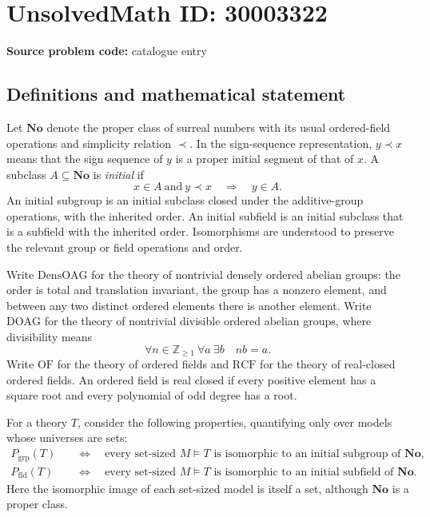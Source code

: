\documentclass[11pt]{article}
\begin{document}
\section*{UnsolvedMath ID: 30003322}
\textbf{Source problem code:} catalogue entry
\subsection{Definitions and mathematical statement}
Let \(\mathbf{No}\) denote the proper class of surreal numbers with its usual ordered-field operations and simplicity relation \(\prec\). In the sign-sequence representation, \(y\prec x\) means that the sign sequence of \(y\) is a proper initial segment of that of \(x\). A subclass \(A\subseteq\mathbf{No}\) is \emph{initial} if
\[
 x\in A\ \text{and}\ y\prec x\quad\Longrightarrow\quad y\in A.
\]
An initial subgroup is an initial subclass closed under the additive-group operations, with the inherited order. An initial subfield is an initial subclass that is a subfield with the inherited order. Isomorphisms are understood to preserve the relevant group or field operations and order.

Write \(\mathrm{DensOAG}\) for the theory of nontrivial densely ordered abelian groups: the order is total and translation invariant, the group has a nonzero element, and between any two distinct ordered elements there is another element. Write \(\mathrm{DOAG}\) for the theory of nontrivial divisible ordered abelian groups, where divisibility means
\[
 \forall n\in\mathbb{Z}_{\geq1}\ \forall a\ \exists b\quad nb=a.
\]
Write \(\mathrm{OF}\) for the theory of ordered fields and \(\mathrm{RCF}\) for the theory of real-closed ordered fields. An ordered field is real closed if every positive element has a square root and every polynomial of odd degree has a root.

For a theory \(T\), consider the following properties, quantifying only over models whose universes are sets:
\[
\begin{aligned}
 P_{\mathrm{grp}}(T)\quad &\Longleftrightarrow\quad
 \text{every set-sized }M\models T\text{ is isomorphic to an initial subgroup of }\mathbf{No},\\
 P_{\mathrm{fld}}(T)\quad &\Longleftrightarrow\quad
 \text{every set-sized }M\models T\text{ is isomorphic to an initial subfield of }\mathbf{No}.
\end{aligned}
\]
Here the isomorphic image of each set-sized model is itself a set, although \(\mathbf{No}\) is a proper class.
\end{document}
